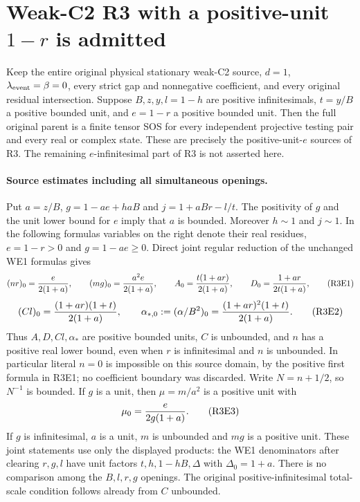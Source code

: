 \section{Weak-C2 R3 with a positive-unit $1-r$ is admitted}
\label{sec:r18-r3-eunit}

\begin{theorem}
Keep the entire original physical stationary weak-C2 source, $d=1$,
$\lambda_{\rm event}=\beta=0$, every strict gap and nonnegative
coefficient, and every original residual intersection. Suppose
$B,z,y,l=1-h$ are positive infinitesimals, $t=y/B$ a positive bounded
unit, and $e=1-r$ a positive bounded unit. Then the full original
parent is a finite tensor SOS for every independent projective testing
pair and every real or complex state. These are precisely the
positive-unit-$e$ sources of R3. The remaining $e$-infinitesimal
part of R3 is not asserted here.
\end{theorem}

\paragraph{Source estimates including all simultaneous openings.}
Put $a=z/B$, $g=1-ae+haB$ and $j=1+aBr-l/t$. The positivity
of $g$ and the unit lower bound for $e$ imply that $a$ is bounded.
Moreover $h\sim1$ and $j\sim1$. In the following formulas variables
on the right denote their real residues, $e=1-r>0$ and
$g=1-ae\ge0$. Direct joint regular reduction of the unchanged WE1
formulas gives
\[
 (nr)_0={e\over2(1+a)},\qquad
 (mg)_0={a^2e\over2(1+a)},\qquad
 A_0={t(1+ar)\over2(1+a)},\qquad
 D_0={1+ar\over2t(1+a)},                         \tag{R3E1}
\]
\[
 (Cl)_0={(1+ar)(1+t)\over2(1+a)},\qquad
 \alpha_{*,0}:=(\alpha/B^2)_0
       ={(1+ar)^2(1+t)\over2(1+a)}.              \tag{R3E2}
\]
Thus $A,D,Cl,\alpha_*$ are positive bounded units, $C$ is unbounded,
and $n$ has a positive real lower bound, even when $r$ is
infinitesimal and $n$ is unbounded. In particular literal $n=0$
is impossible on this source domain, by the positive first formula
in R3E1; no coefficient boundary was discarded. Write
$N=n+1/2$, so $N^{-1}$ is bounded. If $g$ is a unit, then
$\mu=m/a^2$ is a positive unit with
\[
              \mu_0={e\over2g(1+a)}.             \tag{R3E3}
\]
If $g$ is infinitesimal, $a$ is a unit, $m$ is unbounded and $mg$
is a positive unit. These joint statements use only the displayed
products: the WE1 denominators after clearing $r,g,l$ have unit
factors $t,h,1-hB,\Delta$ with $\Delta_0=1+a$.
There is no comparison among the $B,l,r,g$ openings. The original
positive-infinitesimal total-scale condition follows already from
$C$ unbounded.

